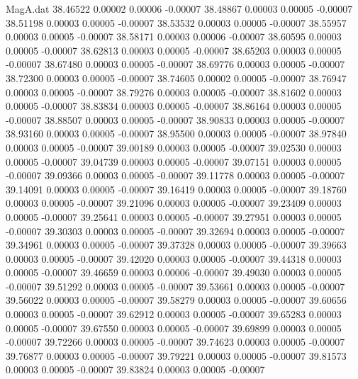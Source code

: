 \begin{filecontents}{MagA.dat}
  38.46522    0.00002    0.00006   -0.00007
  38.48867    0.00003    0.00005   -0.00007
  38.51198    0.00003    0.00005   -0.00007
  38.53532    0.00003    0.00005   -0.00007
  38.55957    0.00003    0.00005   -0.00007
  38.58171    0.00003    0.00006   -0.00007
  38.60595    0.00003    0.00005   -0.00007
  38.62813    0.00003    0.00005   -0.00007
  38.65203    0.00003    0.00005   -0.00007
  38.67480    0.00003    0.00005   -0.00007
  38.69776    0.00003    0.00005   -0.00007
  38.72300    0.00003    0.00005   -0.00007
  38.74605    0.00002    0.00005   -0.00007
  38.76947    0.00003    0.00005   -0.00007
  38.79276    0.00003    0.00005   -0.00007
  38.81602    0.00003    0.00005   -0.00007
  38.83834    0.00003    0.00005   -0.00007
  38.86164    0.00003    0.00005   -0.00007
  38.88507    0.00003    0.00005   -0.00007
  38.90833    0.00003    0.00005   -0.00007
  38.93160    0.00003    0.00005   -0.00007
  38.95500    0.00003    0.00005   -0.00007
  38.97840    0.00003    0.00005   -0.00007
  39.00189    0.00003    0.00005   -0.00007
  39.02530    0.00003    0.00005   -0.00007
  39.04739    0.00003    0.00005   -0.00007
  39.07151    0.00003    0.00005   -0.00007
  39.09366    0.00003    0.00005   -0.00007
  39.11778    0.00003    0.00005   -0.00007
  39.14091    0.00003    0.00005   -0.00007
  39.16419    0.00003    0.00005   -0.00007
  39.18760    0.00003    0.00005   -0.00007
  39.21096    0.00003    0.00005   -0.00007
  39.23409    0.00003    0.00005   -0.00007
  39.25641    0.00003    0.00005   -0.00007
  39.27951    0.00003    0.00005   -0.00007
  39.30303    0.00003    0.00005   -0.00007
  39.32694    0.00003    0.00005   -0.00007
  39.34961    0.00003    0.00005   -0.00007
  39.37328    0.00003    0.00005   -0.00007
  39.39663    0.00003    0.00005   -0.00007
  39.42020    0.00003    0.00005   -0.00007
  39.44318    0.00003    0.00005   -0.00007
  39.46659    0.00003    0.00006   -0.00007
  39.49030    0.00003    0.00005   -0.00007
  39.51292    0.00003    0.00005   -0.00007
  39.53661    0.00003    0.00005   -0.00007
  39.56022    0.00003    0.00005   -0.00007
  39.58279    0.00003    0.00005   -0.00007
  39.60656    0.00003    0.00005   -0.00007
  39.62912    0.00003    0.00005   -0.00007
  39.65283    0.00003    0.00005   -0.00007
  39.67550    0.00003    0.00005   -0.00007
  39.69899    0.00003    0.00005   -0.00007
  39.72266    0.00003    0.00005   -0.00007
  39.74623    0.00003    0.00005   -0.00007
  39.76877    0.00003    0.00005   -0.00007
  39.79221    0.00003    0.00005   -0.00007
  39.81573    0.00003    0.00005   -0.00007
  39.83824    0.00003    0.00005   -0.00007

\end{filecontents}
